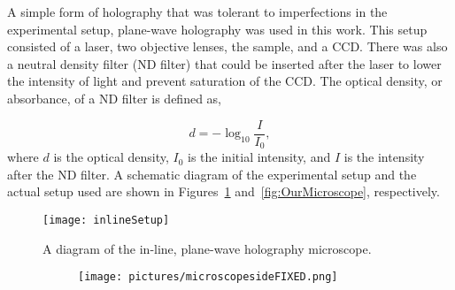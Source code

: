 A simple form of holography that was tolerant to imperfections in the
experimental setup, plane-wave holography was used in this work. This
setup consisted of a laser, two objective lenses, the sample, and a CCD\@. There was
also a neutral density filter (ND filter) that could be inserted after the
laser to lower the
intensity of light and
prevent saturation of the CCD\@.
The optical density, or absorbance, of a ND filter is defined as,

\begin{equation}
    d = -\log_{10}\frac{I}{I_0},
    \label{eq:ND}
\end{equation}
where $d$ is the optical density, $I_0$ is the initial intensity, and $I$ is
the intensity after the ND filter.
A schematic diagram of
the experimental setup and the actual setup used are shown in Figures~\ref{fig:inlineSetup}
and~\ref{fig:OurMicroscope}, respectively.



\begin{figure}[htbp!]
    \begin{center}
        \texttt{[image: inlineSetup]}
    \end{center}
    \caption{A diagram of the in-line, plane-wave holography microscope.}
    \label{fig:inlineSetup}
\end{figure}


\begin{figure}[ht!]
    \begin{center}
        \begin{subfigure}[t]{\textwidth}
            \label{fig:OurMicroscopeSide}
            \texttt{[image: pictures/microscopesideFIXED.png]}
            \caption{}
        \end{subfigure}
%

    \end{center}
\end{figure}

